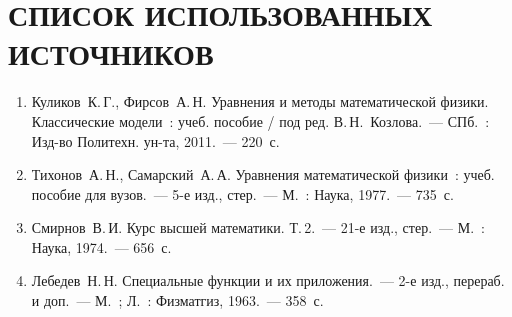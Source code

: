 \chapter*{СПИСОК ИСПОЛЬЗОВАННЫХ ИСТОЧНИКОВ}

\begin{enumerate}[wide=\parindent, label=\arabic*., nosep]

  \item Куликов~К.\,Г., Фирсов~А.\,Н.
    Уравнения и методы математической физики. Классические модели~:
    учеб. пособие / под ред. В.\,Н.~Козлова.~---
    СПб.~: Изд-во Политехн. ун-та, 2011.~--- 220~с.

  \item Тихонов~А.\,Н., Самарский~А.\,А.
    Уравнения математической физики~: учеб. пособие для вузов.~---
    5-е изд., стер.~--- М.~: Наука, 1977.~--- 735~с.

  \item Смирнов~В.\,И.
    Курс высшей математики. Т.\,2.~---
    21-е изд., стер.~--- М.~: Наука, 1974.~--- 656~с.

  \item Лебедев~Н.\,Н.
    Специальные функции и их приложения.~---
    2-е изд., перераб. и доп.~--- М.~; Л.~: Физматгиз, 1963.~--- 358~с.

\end{enumerate}

\clearpage
